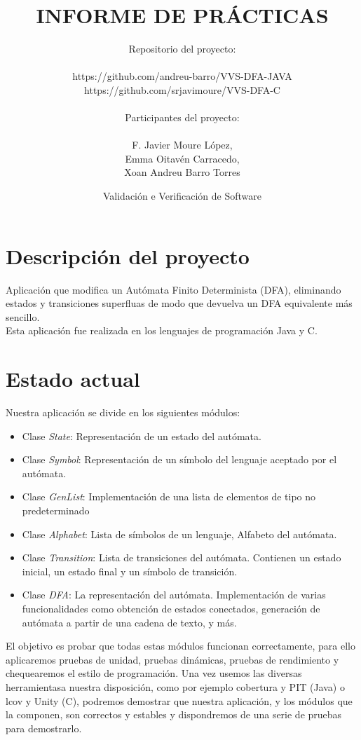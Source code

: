 \documentclass[DIV=calc,paper=a4,fontsize=11pt,onecolumn]{scrartcl} %
\title{INFORME DE PRÁCTICAS} %
\author{Repositorio del proyecto: \\
\begin{itemize}
	\item https://github.com/andreu-barro/VVS-DFA-JAVA \\
	\item https://github.com/srjavimoure/VVS-DFA-C \\
\end{itemize}
Participantes del proyecto: \\
\begin{itemize}
	\item F. Javier Moure López, \\
	\item Emma Oitavén Carracedo, \\
	\item Xoan Andreu Barro Torres \\
\end{itemize}
}
\date{\sffamily Validación e Verificación de Software} %
\begin{document}
\maketitle %
\thispagestyle{fancy} %
\clearpage


\section{Descripción del proyecto}

Aplicación que modifica un Autómata Finito Determinista (DFA), eliminando estados y transiciones superfluas de modo que devuelva un DFA equivalente más sencillo. \\

Esta aplicación fue realizada en los lenguajes de programación Java y C.

\section{Estado actual}

	Nuestra aplicación se divide en los siguientes módulos:
	\begin{itemize}
		\item Clase \textit{State}: Representación de un estado del autómata.
		\item Clase \textit{Symbol}: Representación de un símbolo del lenguaje aceptado por el autómata.
		\item Clase \textit{GenList}: Implementación de una lista de elementos de tipo no predeterminado
		\item Clase \textit{Alphabet}: Lista de símbolos de un lenguaje, Alfabeto del autómata.
		\item Clase \textit{Transition}: Lista de transiciones del autómata. Contienen un estado inicial, un estado final y un símbolo de transición.
		\item Clase \textit{DFA}: La representación del autómata. Implementación de varias funcionalidades como obtención de estados conectados, generación de autómata a partir de una cadena de texto, y más.
	\end{itemize}
	
	El objetivo es probar que todas estas módulos funcionan correctamente, para ello aplicaremos pruebas de unidad, pruebas dinámicas, pruebas de rendimiento y chequearemos el estilo de programación.
	Una vez usemos las diversas herramientasa nuestra disposición, como por ejemplo cobertura y PIT (Java) o lcov y Unity (C), podremos demostrar que nuestra aplicación, y los módulos que la componen, son correctos y estables y dispondremos de una serie de pruebas para demostrarlo. 
\end{document}
